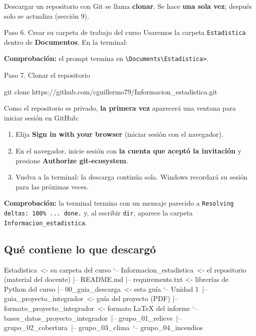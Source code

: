 \documentclass[11pt,a4paper]{article}
\newenvironment{terminal}{\begin{tcolorbox}[terminal]}{\end{tcolorbox}}
\newcommand{\cmd}[1]{\texttt{\textcolor{petroleo}{#1}}}
\begin{document}
Descargar un repositorio con Git se llama \textbf{clonar}. Se hace \textbf{una sola vez}; después solo se actualiza (sección 9).

\begin{paso}{Paso 6. Crear su carpeta de trabajo del curso}
Usaremos la carpeta \texttt{Estadistica} dentro de \textbf{Documentos}. En la terminal:
\begin{terminal}
\end{terminal}
\textbf{Comprobación:} el prompt termina en \texttt{\textbackslash Documents\textbackslash Estadistica>}.
\end{paso}

\begin{paso}{Paso 7. Clonar el repositorio}
\begin{terminal}
\begin{comando}
git clone https://github.com/cguillermo79/Informacion_estadistica.git
\end{comando}
\end{terminal}
Como el repositorio es privado, \textbf{la primera vez} aparecerá una ventana para iniciar sesión en GitHub:
\begin{enumerate}[leftmargin=*]
  \item Elija \textbf{Sign in with your browser} (iniciar sesión con el navegador).
  \item En el navegador, inicie sesión con \textbf{la cuenta que aceptó la invitación} y presione \textbf{Authorize git-ecosystem}.
  \item Vuelva a la terminal: la descarga continúa sola. Windows recordará su sesión para las próximas veces.
\end{enumerate}
\textbf{Comprobación:} la terminal termina con un mensaje parecido a \texttt{Resolving deltas: 100\% ... done.} y, al escribir \cmd{dir}, aparece la carpeta \texttt{Informacion\_estadistica}.
\end{paso}

\subsection{Qué contiene lo que descargó}

\begin{terminal}
\begin{comando}
Estadistica\                              <- su carpeta del curso
`-- Informacion_estadistica\              <- el repositorio (material del docente)
    |-- README.md
    |-- requirements.txt                  <- librerías de Python del curso
    |-- 00_guia_descarga\                 <- esta guía
    `-- Unidad 1\
        |-- guia_proyecto_integrador\     <- guía del proyecto (PDF)
        |-- formato_proyecto_integrador\  <- formato LaTeX del informe
        `-- bases_datos_proyecto_integrador\
            |-- grupo_01_relieve\
            |-- grupo_02_cobertura\
            |-- grupo_03_clima\
            `-- grupo_04_incendios\
\end{comando}
\end{terminal}
\end{document}
